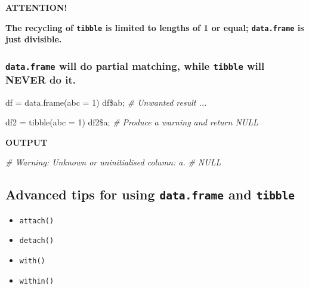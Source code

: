 \documentclass[
]{article}
\newenvironment{Shaded}{}{}
\newcommand{\AttributeTok}[1]{\textcolor[rgb]{0.49,0.56,0.16}{#1}}
\newcommand{\CommentTok}[1]{\textcolor[rgb]{0.38,0.63,0.69}{\textit{#1}}}
\newcommand{\DecValTok}[1]{\textcolor[rgb]{0.25,0.63,0.44}{#1}}
\newcommand{\FunctionTok}[1]{\textcolor[rgb]{0.02,0.16,0.49}{#1}}
\newcommand{\NormalTok}[1]{#1}
\newcommand{\OtherTok}[1]{\textcolor[rgb]{0.00,0.44,0.13}{#1}}
\newcommand{\SpecialCharTok}[1]{\textcolor[rgb]{0.25,0.44,0.63}{#1}}
\begin{document}
\textbf{ATTENTION!}

\textbf{The recycling of \texttt{tibble} is limited to lengths of 1 or
equal; \texttt{data.frame} is just divisible.}

\hypertarget{dataframe-will-do-partial-matching-while-tibble-will-never-do-it}{%
\subsubsection{\texorpdfstring{\texttt{data.frame} will do partial
matching, while \texttt{tibble} will \textbf{NEVER} do
it.}{data.frame will do partial matching, while tibble will NEVER do it.}}\label{dataframe-will-do-partial-matching-while-tibble-will-never-do-it}}

\begin{Shaded}
\begin{Highlighting}[]
\NormalTok{df }\OtherTok{=} \FunctionTok{data.frame}\NormalTok{(}\AttributeTok{abc =} \DecValTok{1}\NormalTok{) }
\NormalTok{df}\SpecialCharTok{\$}\NormalTok{ab; }\CommentTok{\# Unwanted result ...}

\NormalTok{df2 }\OtherTok{=} \FunctionTok{tibble}\NormalTok{(}\AttributeTok{abc =} \DecValTok{1}\NormalTok{)}
\NormalTok{df2}\SpecialCharTok{\$}\NormalTok{a; }\CommentTok{\# Produce a warning and return NULL}
\end{Highlighting}
\end{Shaded}

\textbf{OUTPUT}

\begin{Shaded}
\begin{Highlighting}[]
\CommentTok{\# Warning: Unknown or uninitialised column: \textasciigrave{}a\textasciigrave{}. }
\CommentTok{\# NULL}
\end{Highlighting}
\end{Shaded}

\hypertarget{advanced-tips-for-using-dataframe-and-tibble}{%
\subsection{\texorpdfstring{Advanced tips for using \texttt{data.frame}
and
\texttt{tibble}}{Advanced tips for using data.frame and tibble}}\label{advanced-tips-for-using-dataframe-and-tibble}}

\begin{itemize}
\item
  \texttt{attach()}
\item
  \texttt{detach()}
\item
  \texttt{with()}
\item
  \texttt{within()}
\end{itemize}
\end{document}
